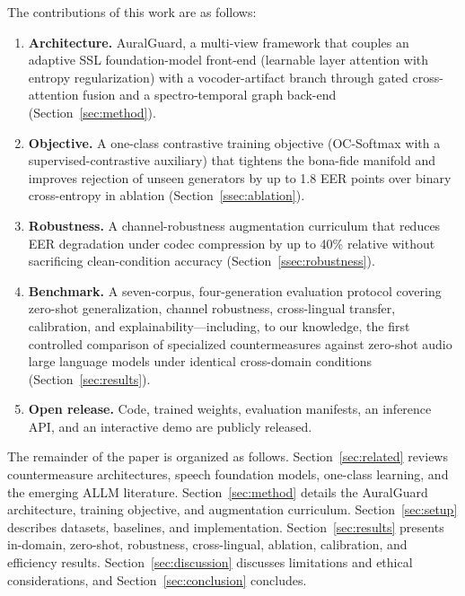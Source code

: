 The contributions of this work are as follows:
\begin{enumerate}
    \item \textbf{Architecture.} AuralGuard, a multi-view framework that couples an
        adaptive SSL foundation-model front-end (learnable layer attention with entropy
        regularization) with a vocoder-artifact branch through gated cross-attention
        fusion and a spectro-temporal graph back-end (Section~\ref{sec:method}).
    \item \textbf{Objective.} A one-class contrastive training objective (OC-Softmax
        with a supervised-contrastive auxiliary) that tightens the bona-fide manifold
        and improves rejection of unseen generators by up to 1.8 EER points over
        binary cross-entropy in ablation (Section~\ref{ssec:ablation}).
    \item \textbf{Robustness.} A channel-robustness augmentation curriculum that reduces
        EER degradation under codec compression by up to 40\% relative without
        sacrificing clean-condition accuracy (Section~\ref{ssec:robustness}).
    \item \textbf{Benchmark.} A seven-corpus, four-generation evaluation protocol
        covering zero-shot generalization, channel robustness, cross-lingual transfer,
        calibration, and explainability---including, to our knowledge, the first
        controlled comparison of specialized countermeasures against zero-shot audio
        large language models under identical cross-domain conditions
        (Section~\ref{sec:results}).
    \item \textbf{Open release.} Code, trained weights, evaluation manifests, an
        inference API, and an interactive demo are publicly released.
\end{enumerate}

The remainder of the paper is organized as follows. Section~\ref{sec:related} reviews
countermeasure architectures, speech foundation models, one-class learning, and the
emerging ALLM literature. Section~\ref{sec:method} details the AuralGuard architecture,
training objective, and augmentation curriculum. Section~\ref{sec:setup} describes
datasets, baselines, and implementation. Section~\ref{sec:results} presents in-domain,
zero-shot, robustness, cross-lingual, ablation, calibration, and efficiency results.
Section~\ref{sec:discussion} discusses limitations and ethical considerations, and
Section~\ref{sec:conclusion} concludes.

